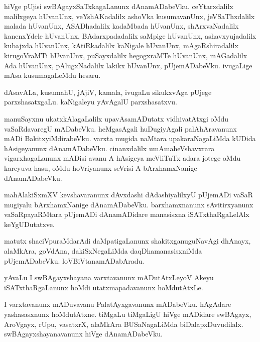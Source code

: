 \documentclass{article}
\begin{document}
\begin{mn}
hiVge  pUjisi  swBAgayxSaTxkagaLanunx  dAnamADabeVku.  ceYtarxdalilx  malilxgeya  hUvanUnx,  
veYshAKadalilx  ashoVka  kusumavanUnx,  jeVSaThxdalilx  malada  hUvanUnx,  ASADhadalilx  
kadaMbada  hUvanUnx,  shArxvaNadalilx  kanenxYdele  hUvanUnx,  BAdarxpadadalilx  saMpige  hUvanUnx,  
ashavxyujadalilx  kubajxda  hUvanUnx,  kAtiRkadalilx  kaNigale  hUvanUnx,  mAgaRshiradalilx  
kirugoVraMTi  hUvanUnx,  puSayxdalilx  hegogxraMTe  hUvanUnx,  mAGadalilx  Ada  hUvanUnx,  
pAlugxNadalilx  lakikx  hUvanUnx,  pUjemADabeVku.  ivugaLige  mAsa  kusumagaLeMdu  hesaru.
\end{mn}

\begin{mn}

dAsavALa,  kusumahU,  jAjiV,  kamala,  ivugaLu  sikukxvAga  pUjege  parxshasatxgaLu.  kaNigaleyu  
yAvAgalU  parxshasatxvu.
\end{mn}

\begin{mn}
manuSayxnu  ukatxkAlagaLalilx  upavAsamADutatx  vidhivatAtxgi  oMdu  vaSaRdavaregU  mADabeVku.  
heMgasAgali  huDugiyAgali  palAhAravanunx  mADi  BakitxyiMdirabeVku.  varxta  mugida naMtara  
upakaraNagaLiMda  kUDida  hAsigeyanunx  dAnamADabeVku.  cinanxdalilx  umAmaheVshavxrara  
vigarxhagaLanunx  mADisi  avanu  A  hAsigeya  meVliTuTx  adara  jotege  oMdu  kareyuva  hasu,  
oMdu  hoVriyanunx  seVrisi  A  bArxhamxNanige  dAnamADabeVku.
\end{mn}

\begin{mn}
mahAlakiSxmXV  kevshavaranunx  dAvxdashi  dAdashiyalilxyU  pUjemADi  vaSaR  mugiyalu  bArxhamxNanige  
dAnamADabeVku.  barxhamxnanunx  sAvitirxyanunx  vaSaRpayaRMtara  pUjemADi  dAnamADidare  manasisxna  
iSATxthaRgaLelAlx  keYgUDutatxve.
\end{mn}

\begin{mn}
matutx  shaciVpuraMdarAdi  daMpatigaLanunx  shakitxganuguNavAgi  dhAnayx,  alaMkAra,  goVdAna,  
dakiSxNegaLiMda  daqDhamanasisxniMda  pUjemADabeVku.  loVBiVtanamADabAradu.
\end{mn}

\begin{mn}
yAvaLu  I  swBAgayxshayana  varxtavanunx  mADutAtxLeyoV  Akeyu  iSATxthaRgaLanunx  hoMdi  
utatxmapadavanunx hoMdutAtxLe.
\end{mn}

\begin{mn}
I  varxtavanunx  mADuvavanu  PalatAyxgavanunx  mADabeVku.  hAgAdare  yashasasxnunx  hoMdutAtxne.  
tiMgaLu  tiMgaLigU  hiVge  mADidare  swBAgayx,  AroVgayx,  rUpu,  vasatxrX,  alaMkAra  BUSaNagaLiMda  
biDalapxDuvudilalx.  swBAgayxshayanavanunx  hiVge  dAnamADabeVku.
\end{mn}
\end{document}
